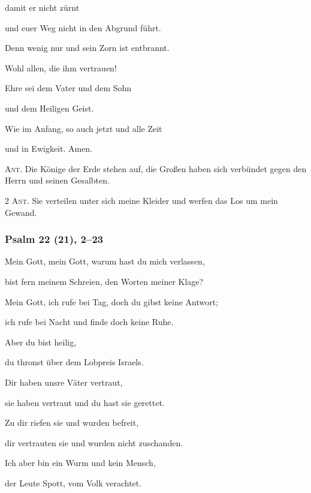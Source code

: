 \noindent damit er nicht zürnt~\GreStar{}~\nopagebreak

und euer Weg nicht in den Abgrund führt. 
 
\noindent Denn wenig nur und sein Zorn ist entbrannt.~\GreStar{}~\nopagebreak

Wohl allen, die ihm vertrauen!

\noindent Ehre sei dem Vater und dem Sohn~\GreStar{}~\nopagebreak

und dem Heiligen Geist.

\noindent Wie im Anfang, so auch jetzt und alle Zeit~\GreStar{}~\nopagebreak

und in Ewigkeit. Amen.

\vspace{10pt}

\noindent \textsc{Ant.} Die Könige der Erde stehen auf, die Großen haben sich verbündet gegen den Herrn und seinen Gesalbten.

\vspace{10pt}


\noindent \textsc{2 Ant.} Sie verteilen unter sich meine Kleider und werfen das Los um mein Gewand.

\subsubsection{Psalm 22 (21), 2--23}

\noindent Mein Gott, mein Gott, warum hast du mich verlassen,~\GreStar{}~\nopagebreak

bist fern meinem Schreien, den Worten meiner Klage?
 
\noindent Mein Gott, ich rufe bei Tag, doch du gibst keine Antwort;~\GreStar{}~\nopagebreak

ich rufe bei Nacht und finde doch keine Ruhe.
 
\noindent Aber du bist heilig,~\GreStar{}~\nopagebreak

du thronst über dem Lobpreis Israels.
 
\noindent Dir haben unsre Väter vertraut,~\GreStar{}~\nopagebreak

sie haben vertraut und du hast sie gerettet.
 
\noindent Zu dir riefen sie und wurden befreit,~\GreStar{}~\nopagebreak

dir vertrauten sie und wurden nicht zuschanden.
 
\noindent Ich aber bin ein Wurm und kein Mensch,~\GreStar{}~\nopagebreak

der Leute Spott, vom Volk verachtet.
 
